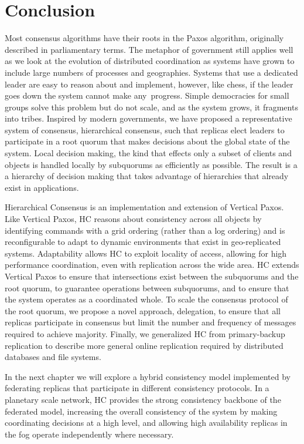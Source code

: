 \section{Conclusion}
\label{ch03_conclusion}

Most consensus algorithms have their roots in the Paxos algorithm, originally described in parliamentary terms.
The metaphor of government still applies well as we look at the evolution of distributed coordination as systems have grown to include large numbers of processes and geographies.
Systems that use a dedicated leader are easy to reason about and implement, however, like chess, if the leader goes down the system cannot make any\ progress.
Simple democracies for small groups solve this problem but do not scale, and as the system grows, it fragments into tribes.
Inspired by modern governments, we have proposed a representative system of consensus, hierarchical consensus, such that replicas elect leaders to participate in a root quorum that makes decisions about the global state of the system.
Local decision making, the kind that effects only a subset of clients and objects is handled locally by subquorums as efficiently as possible.
The result is a a hierarchy of decision making that takes advantage of hierarchies that already exist in applications.

Hierarchical Consensus is an implementation and extension of Vertical Paxos.
Like Vertical Paxos, HC reasons about consistency across all objects by identifying commands with a grid ordering (rather than a log ordering) and is reconfigurable to adapt to dynamic environments that exist in geo-replicated systems.
Adaptability allows HC to exploit locality of access, allowing for high performance coordination, even with replication across the wide area.
HC extends Vertical Paxos to ensure that intersections exist between the subquorums and the root quorum, to guarantee operations between subquorums, and to ensure that the system operates as a coordinated whole.
To scale the consensus protocol of the root quorum, we propose a novel approach, delegation, to ensure that all replicas participate in consensus but limit the number and frequency of messages required to achieve majority.
Finally, we generalized HC from primary-backup replication to describe more general online replication required by distributed databases and file systems.

In the next chapter we will explore a hybrid consistency model implemented by federating replicas that participate in different consistency protocols.
In a planetary scale network, HC provides the strong consistency backbone of the federated model, increasing the overall consistency of the system by making coordinating decisions at a high level, and allowing high availability replicas in the fog operate independently where necessary.
